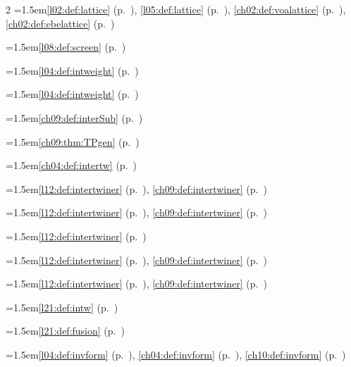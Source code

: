 \begin{multicols}{2}
\hangindent=1.5em\quad \ref{l02:def:lattice} (p.~\pageref{l02:def:lattice}), \ref{l05:def:lattice} (p.~\pageref{l05:def:lattice}), \ref{ch02:def:voalattice} (p.~\pageref{ch02:def:voalattice}), \ref{ch02:def:ebelattice} (p.~\pageref{ch02:def:ebelattice})\par
\hangindent=1.5em\quad \ref{l08:def:screen} (p.~\pageref{l08:def:screen})\par
\hangindent=1.5em\quad \ref{l04:def:intweight} (p.~\pageref{l04:def:intweight})\par
\hangindent=1.5em\quad \ref{l04:def:intweight} (p.~\pageref{l04:def:intweight})\par
\hangindent=1.5em\quad \ref{ch09:def:interSub} (p.~\pageref{ch09:def:interSub})\par
\hangindent=1.5em\quad \ref{ch09:thm:TPgen} (p.~\pageref{ch09:thm:TPgen})\par
\hangindent=1.5em\quad \ref{ch04:def:intertw} (p.~\pageref{ch04:def:intertw})\par
\hangindent=1.5em\quad \ref{l12:def:intertwiner} (p.~\pageref{l12:def:intertwiner}), \ref{ch09:def:intertwiner} (p.~\pageref{ch09:def:intertwiner})\par
\hangindent=1.5em\quad \ref{l12:def:intertwiner} (p.~\pageref{l12:def:intertwiner}), \ref{ch09:def:intertwiner} (p.~\pageref{ch09:def:intertwiner})\par
\hangindent=1.5em\quad \ref{l12:def:intertwiner} (p.~\pageref{l12:def:intertwiner})\par
\hangindent=1.5em\quad \ref{l12:def:intertwiner} (p.~\pageref{l12:def:intertwiner}), \ref{ch09:def:intertwiner} (p.~\pageref{ch09:def:intertwiner})\par
\hangindent=1.5em\quad \ref{l12:def:intertwiner} (p.~\pageref{l12:def:intertwiner}), \ref{ch09:def:intertwiner} (p.~\pageref{ch09:def:intertwiner})\par
\hangindent=1.5em\quad \ref{l21:def:intw} (p.~\pageref{l21:def:intw})\par
\hangindent=1.5em\quad \ref{l21:def:fusion} (p.~\pageref{l21:def:fusion})\par
\hangindent=1.5em\quad \ref{l04:def:invform} (p.~\pageref{l04:def:invform}), \ref{ch04:def:invform} (p.~\pageref{ch04:def:invform}), \ref{ch10:def:invform} (p.~\pageref{ch10:def:invform})\par

\end{multicols}
